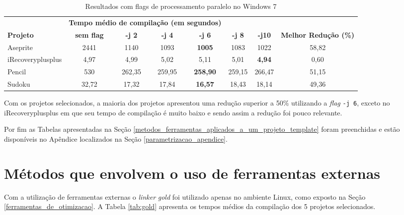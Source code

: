 \begin{table}[!ht]
\tiny
\centering
\caption{Resultados com flags de processamento paralelo no Windows 7}
\label{tab:flags_processamento_paralelo:windows}
\begin{tabular}{lccccccc}
& \multicolumn{4}{c}{\textbf{Tempo médio de compilação (em segundos)} } \\
\textbf{Projeto} & \textbf{sem flag} & \textbf{-j 2} & \textbf{-j 4} & \textbf{-j 6} & \textbf{-j 8} & \textbf{-j10} &  \textbf{Melhor Redução (\%)} \\ \toprule
Aseprite            & 2441      & 1140      & 1093      & \textbf{1005}     & 1083 & 1022  &  58,82  \\ 
iRecoveryplusplus   & 4,97      & 4,99      &  5,02     & 5,11              & 5,01 & \textbf{4,94} & 0,60 \\ 
Pencil              & 530       & 262,35    & 259,95    & \textbf{258,90}   & 259,15 & 266,47  & 51,15 \\ 
Sudoku              & 32,72     & 17,32     & 17,84     & \textbf{16,57}    & 18,43 & 18,14 & 49,36 \\ 
\end{tabular}
\end{table}

Com os projetos selecionados, a maioria dos projetos apresentou uma redução superior a 50\%  utilizando a \textit{flag} \texttt{-j 6}, exceto no iRecoveryplusplus em que seu tempo de compilação é muito baixo e sendo assim a redução foi pouco relevante.


Por fim as Tabelas apresentadas na Seção \ref{metodos_ferramentas_aplicados_a_um_projeto_template} foram preenchidas e estão disponíveis no Apêndice localizados na Seção \ref{parametrizacao_apendice}.


\section{Métodos que envolvem o uso de ferramentas externas}


Com a utilização de ferramentas externas o \textit{linker} \textit{gold}
 foi utilizado apenas no ambiente Linux, como exposto na Seção
 \ref{ferramentas_de_otimizacao}. A Tabela \ref{tab:gold} apresenta
 os tempos médios da compilação dos 5 projetos selecionados.

